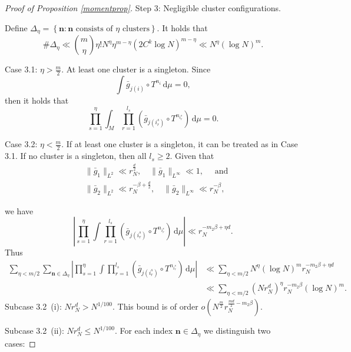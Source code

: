 \documentclass[10pt,a4paper]{amsart}
\renewcommand{\d}{\, \text{d}}
\begin{document}
\begin{proof}[Proof of Proposition \ref{momentprop}]
Step 3: Negligible cluster configurations.

Define $\Delta_\eta = \left\{\mathbf{n} : \mathbf{n} \text{ consists of } \eta \text{ clusters}\right\}.$
It holds that
\begin{equation}\label{clusternumber}
\#\Delta_{\eta} \ll \binom{m}{\eta}\eta !N^{\eta}\eta^{m-\eta} \left(2C^k\log N\right)^{m-\eta}\ll N^{\eta} (\log N)^{m}.
\end{equation}



Case 3.1: $\eta>\frac{m}{2}.$ At least one cluster is a singleton.
Since
$$\int\bar{g}_{j(i)} \circ T^{n_i} \d\mu = 0,$$
then it holds that
\begin{equation*}
\prod_{s=1}^{\eta} \int_M \prod_{r=1}^{l_s} (\bar{g}_{j(i^s_r)} \circ T^{n_{i^s_r}}) \d\mu=0.
\end{equation*}

Case 3.2: $\eta<\frac{m}{2}.$ If at least one cluster is a singleton, it can be treated as in Case 3.1.
If no cluster is a singleton, then all $l_s \geq 2$. Given that
\begin{align*}
&\|\bar{g}_1\|_{L^2} \ll r_N^{\frac{d}{2}},\quad \|\bar{g}_1\|_{L^{\infty}} \ll 1, \quad \text{ and}\\
&\|\bar{g}_2\|_{L^2} \ll r_N^{-\beta+\frac{d}{2}},\quad \|\bar{g}_2\|_{L^{\infty}} \ll r_N^{-\beta},
\end{align*}




we have
\begin{equation}\label{clusterint}
\left|\prod_{s=1}^{\eta}\int\prod_{r=1}^{l_s}(\bar{g}_{j(i^s_r)} \circ T^{n_{i^s_r}})\d\mu\right|\ll
r_N^{-m_2 \beta + \eta d}.
\end{equation}
Thus
\begin{equation*}
\begin{aligned}
\sum_{\eta<m/2} \sum_{\mathbf{n} \in \Delta_\eta}
\left|\prod_{s=1}^{\eta}\int\prod_{r=1}^{l_s}(\bar{g}_{j(i^s_r)} \circ T^{n_{i^s_r}})\d\mu\right|
&\ll\sum_{\eta<m/2}N^{\eta} (\log N)^m r_N^{-m_2 \beta + \eta d}\\
&\ll\sum_{\eta<m/2} \left(N r_N^d\right)^\eta r_N^{- m_2 \beta}(\log N)^m.
\end{aligned}
\end{equation*}
Subcase 3.2~(i): $N r_N^d>N^{1/100}$. This bound is of order $o\left(N^{\frac{m}{2}} r_N^{\frac{md}{2} - m_2 \beta}\right).$

Subcase 3.2~(ii): $N r_N^d\leq N^{1/100}$. For each index $\textbf{n}\in \Delta_{\eta}$ we distinguish two cases:


\end{proof}
\end{document}

